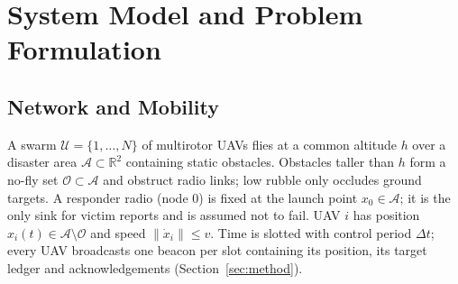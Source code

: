 \section{System Model and Problem Formulation}\label{sec:model}

\subsection{Network and Mobility}
A swarm $\mathcal{U}=\{1,\dots,N\}$ of multirotor UAVs flies at a common altitude $h$ over a
disaster area $\mathcal{A}\subset\mathbb{R}^2$ containing static obstacles. Obstacles taller than
$h$ form a no-fly set $\mathcal{O}\subset\mathcal{A}$ and obstruct radio links; low rubble only
occludes ground targets. A responder radio (node $0$) is fixed at the launch point
$x_0\in\mathcal{A}$; it is the only sink for victim reports and is assumed not to fail. UAV $i$
has position $x_i(t)\in\mathcal{A}\setminus\mathcal{O}$ and speed $\|\dot x_i\|\le v$. Time is
slotted with control period $\Delta t$; every UAV broadcasts one beacon per slot containing its
position, its target ledger and acknowledgements (Section~\ref{sec:method}).

